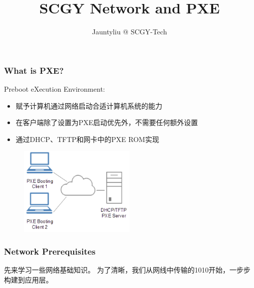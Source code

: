 \documentclass[11pt]{beamer}
\author{Jauntyliu @ SCGY-Tech}
\title{SCGY Network and PXE}
\begin{document}
\begin{frame}
\titlepage
\end{frame}


\begin{frame}
\frametitle{What is PXE?}

Preboot eXecution Environment:
\begin{itemize}
\item 赋予计算机通过网络启动合适计算机系统的能力
\item 在客户端除了设置为PXE启动优先外，不需要任何额外设置
\item 通过DHCP、TFTP和网卡中的PXE ROM实现
\end{itemize}
\begin{figure}
\includegraphics[width=0.5\textwidth]{290px-PXE_diagram.png}
\end{figure}
\end{frame}


\begin{frame}
\frametitle{Network Prerequisites}
先来学习一些网络基础知识。
为了清晰，我们从网线中传输的1010开始，一步步构建到应用层。
\end{frame}
\end{document}
